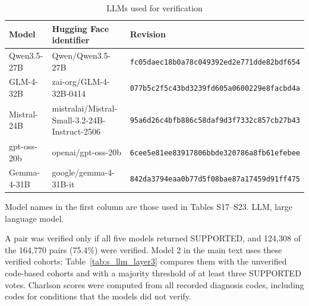 \documentclass[unnumsec,webpdf,contemporary,large]{oup-authoring-template}
\begin{document}
\begin{table}[H]
\caption{LLMs used for verification}
\label{tab:s_llm_versions}
\centering
\scriptsize
\begin{tabular}{@{}lll@{}}
\toprule
Model & Hugging Face identifier & Revision \\
\midrule
Qwen3.5-27B & Qwen/Qwen3.5-27B & \texttt{fc05daec18b0a78c049392ed2e771dde82bdf654} \\
GLM-4-32B & zai-org/GLM-4-32B-0414 & \texttt{077b5c2f5c43bd3239fd605a0600229e8facbd4a} \\
Mistral-24B & mistralai/Mistral-Small-3.2-24B-Instruct-2506 & \texttt{95a6d26c4bfb886c58daf9d3f7332c857cb27b43} \\
gpt-oss-20b & openai/gpt-oss-20b & \texttt{6cee5e81ee83917806bbde320786a8fb61efebee} \\
Gemma-4-31B & google/gemma-4-31B-it & \texttt{842da3794eaa0b77d5f08bae87a17459d91ff475} \\
\bottomrule
\end{tabular}
\begin{tablenotes}
\item Model names in the first column are those used in Tables S17--S23. LLM, large language model.
\end{tablenotes}
\end{table}

A pair was verified only if all five models returned SUPPORTED, and 124,308 of the 164,770 pairs (75.4\%) were verified. Model 2 in the main text uses these verified cohorts; Table~\ref{tab:s_llm_layer3} compares them with the unverified code-based cohorts and with a majority threshold of at least three SUPPORTED votes. Charlson scores were computed from all recorded diagnosis codes, including codes for conditions that the models did not verify.
\end{document}
